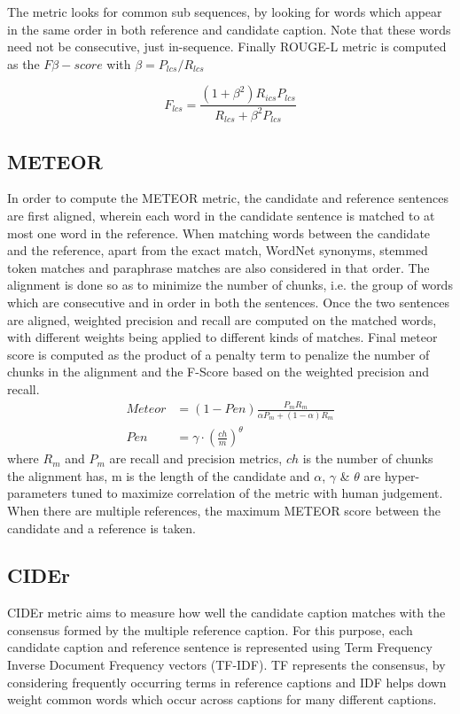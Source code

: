 The metric looks for common sub sequences, by looking for words which appear in the
same order in both reference and candidate caption.
Note that these words need not be consecutive, just in-sequence.
Finally ROUGE-L metric is computed as the $F\beta-score$ with $\beta =
P_{lcs}/R_{lcs}$

\begin{equation}
        F_{lcs} = \frac{(1+\beta^2)R_{ics}P_{lcs}}{R_{lcs}+ \beta^2 P_{lcs}}
\end{equation}

\subsection{METEOR}
In order to compute the METEOR metric, the candidate and reference sentences are
first aligned, wherein each word in the candidate sentence is matched to
at most one word in the reference.
When matching words between the candidate and the reference, apart from the
exact match, WordNet synonyms, stemmed token matches and paraphrase matches are
also considered in that order.
The alignment is done so as to minimize the number of chunks, i.e. the group of
words which are consecutive and in order in both the sentences.
Once the two sentences are aligned, weighted precision and recall are computed
on the matched words, with different weights being applied to different kinds of
matches.
Final meteor score is computed as the product of a penalty term to penalize the
number of chunks in the alignment and the F-Score based on the weighted
precision and recall.
\begin{align}
        Meteor &= (1-Pen)\frac{P_m R_m}{\alpha{}P_m+(1-\alpha)R_m}\\[0.75ex]
        Pen &= \gamma\cdot\left(\frac{ch}{m}\right)^\theta
\end{align}
\noindent where $R_m$ and $P_m$ are recall and precision metrics, $ch$ is the
number of chunks the alignment has, m is the length of the candidate and
$\alpha$, $\gamma$ \& $\theta$ are hyper-parameters tuned to maximize
correlation of the metric with human judgement.
When there are multiple references, the maximum METEOR score between the
candidate and a reference is taken.

\subsection{CIDEr}
CIDEr metric aims to measure how well the candidate caption matches with the
consensus formed by the multiple reference caption.
For this purpose, each candidate caption and reference sentence is represented
using Term Frequency Inverse Document Frequency vectors (TF-IDF).
TF represents the consensus, by considering frequently occurring terms in
reference captions and IDF helps down weight common words which occur across
captions for many different captions.

